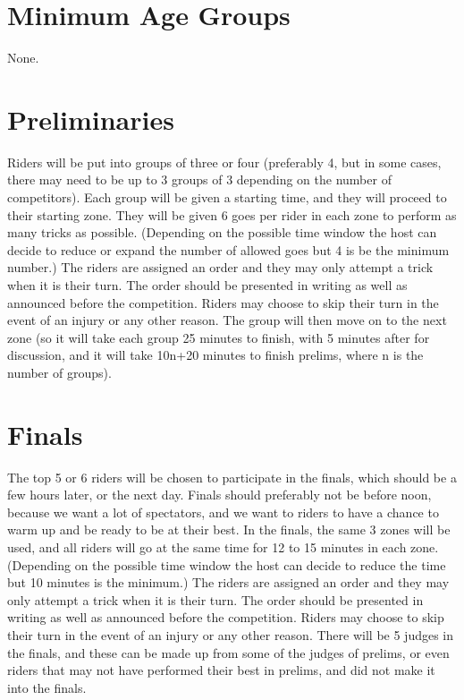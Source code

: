 \section{Minimum Age Groups}
None.

\section{Preliminaries}
Riders will be put into groups of three or four (preferably 4, but in some cases, there may need to be up to 3 groups of 3 depending on the number of competitors).
Each group will be given a starting time, and they will proceed to their starting zone.
They will be given 6 goes per rider in each zone to perform as many tricks as possible.
(Depending on the possible time window the host can decide to reduce or expand the number of allowed goes but 4 is be the minimum number.)
The riders are assigned an order and they may only attempt a trick when it is their turn.
The order should be presented in writing as well as announced before the competition.
Riders may choose to skip their turn in the event of an injury or any other reason.
The group will then move on to the next zone (so it will take each group 25 minutes to finish, with 5 minutes after for discussion, and it will take 10n+20 minutes to finish prelims, where n is the number of groups).

\section{Finals}
The top 5 or 6 riders will be chosen to participate in the finals, which should be a few hours later, or the next day.
Finals should preferably not be before noon, because we want a lot of spectators, and we want to riders to have a chance to warm up and be ready to be at their best.
In the finals, the same 3 zones will be used, and all riders will go at the same time for 12 to 15 minutes in each zone.
(Depending on the possible time window the host can decide to reduce the time but 10 minutes is the minimum.)
The riders are assigned an order and they may only attempt a trick when it is their turn.
The order should be presented in writing as well as announced before the competition.
Riders may choose to skip their turn in the event of an injury or any other reason.
There will be 5 judges in the finals, and these can be made up from some of the judges of prelims, or even riders that may not have performed their best in prelims, and did not make it into the finals.

